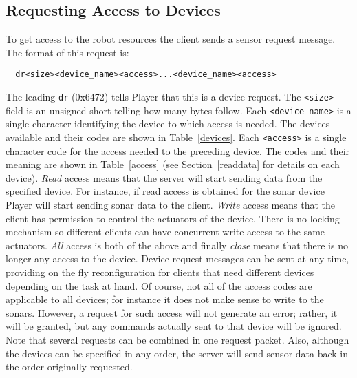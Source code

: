 \documentclass[11pt]{article}
\begin{document}
\subsection{Requesting Access to Devices}
\label{sec:requestingacces}
To get access to the robot resources the client sends a sensor request
message.  The format of this request is:

\begin{verbatim}
  dr<size><device_name><access>...<device_name><access>
\end{verbatim}

The leading {\tt dr} (0x6472) tells Player that this is a device request.
The {\tt <size>} field is an unsigned short telling how many bytes
follow. Each {\tt <device\_name>} is a single character identifying the 
device to which 
access is needed. The devices available and their codes are shown in 
Table~\ref{devices}. 
Each {\tt <access>} is a single character code for the access needed to the 
preceding device. The codes and
their meaning are shown in Table~\ref{access} (see Section~\ref{readdata}
for details on each device). {\sl Read} access means that
the server will start sending data from the specified device. For instance,
if read access is obtained for the sonar device Player will start sending
sonar data to the client. {\sl Write} access means that the client has 
permission to control the actuators of the device. There is no locking 
mechanism so different clients can have concurrent write access to the same 
actuators.  {\sl All} access is both of the 
above and finally {\sl close} means that there is no longer any access 
to the device. Device request messages can be sent at any time,
providing on the fly reconfiguration for clients that need different devices 
depending on the task at hand.
Of course, not all of the access codes are applicable to all devices; for 
instance it does not make sense to write to the sonars.   However, a request
for such access will not generate an error; rather, it will be granted, but
any commands actually sent to that device will be ignored.
Note that several 
requests can be combined in one request packet.  Also, although the
devices can be specified in any order, the server will send sensor
data back in the order originally requested.
\end{document}
